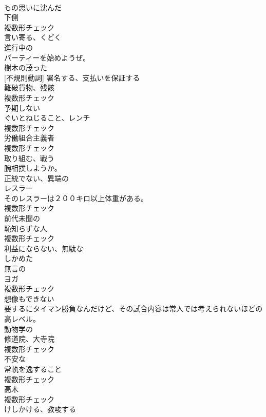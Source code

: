\documentclass[8pt]{extreport}
\begin{document}
\begin{CJK}{UTF8}{min}
\\	[形容詞]	もの思いに沈んだ	
\\	[名詞]	下側	
\\	複数形チェック
\\	[動詞]	言い寄る、くどく	
\\	[形容詞]	進行中の	
\\	パーティーを始めようぜ。	
\\	[形容詞]	樹木の茂った	
\\	[動詞] [不規則動詞]	署名する、支払いを保証する	
\\	[名詞]	難破貨物、残骸	
\\	複数形チェック
\\	[形容詞]	予期しない	
\\	[名詞]	ぐいとねじること、レンチ	
\\	複数形チェック
\\	[名詞]	労働組合主義者	
\\	複数形チェック
\\	[動詞]	取り組む、戦う	
\\	腕相撲しようか。	
\\	[形容詞]	正統でない、異端の	
\\	[名詞]	レスラー	
\\	そのレスラーは２００キロ以上体重がある。	
\\	複数形チェック
\\	[形容詞]	前代未聞の	
\\	[名詞]	恥知らずな人	
\\	複数形チェック
\\	[形容詞]	利益にならない、無駄な	
\\	[形容詞]	しかめた	
\\	[形容詞]	無言の	
\\	[名詞]	ヨガ	
\\	複数形チェック
\\	[形容詞]	想像もできない	
\\	要するにタイマン勝負なんだけど、その試合内容は常人では考えられないほどの高レベル。	
\\	[形容詞]	動物学の	
\\	[名詞]	修道院、大寺院	
\\	複数形チェック
\\	[形容詞]	不安な	
\\	[名詞]	常軌を逸すること	
\\	複数形チェック
\\	[名詞]	高木	
\\	複数形チェック
\\	[動詞]	けしかける、教唆する	

\end{CJK}
\end{document}

